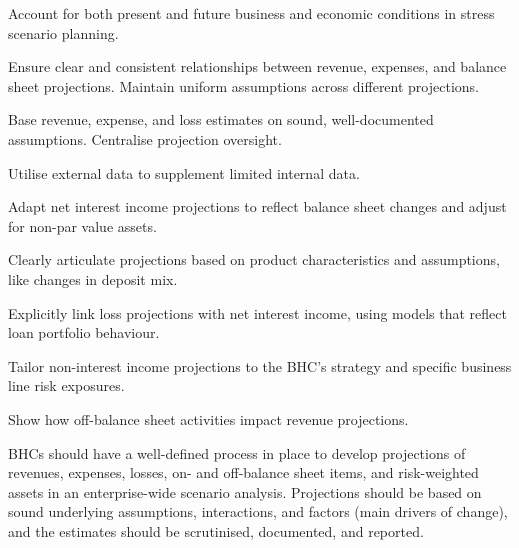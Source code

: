 \begin{lettered}
\item Account for both present and future business and economic conditions in
stress scenario planning.
\item Ensure clear and consistent relationships between revenue, expenses, and
balance sheet projections. Maintain uniform assumptions across different
projections.
\item Base revenue, expense, and loss estimates on sound, well-documented
assumptions. Centralise projection oversight.
\item Utilise external data to supplement limited internal data.
\item Adapt net interest income projections to reflect balance sheet changes and
adjust for non-par value assets.
\item Clearly articulate projections based on product characteristics and
assumptions, like changes in deposit mix.
\item Explicitly link loss projections with net interest income, using models that
reflect loan portfolio behaviour.
\item Tailor non-interest income projections to the BHC's strategy and specific
business line risk exposures.
\item Show how off-balance sheet activities impact revenue projections.
\end{lettered}


BHCs should have a well-defined process in place to develop projections of
revenues, expenses, losses, on- and off-balance sheet items, and risk-weighted
assets in an enterprise-wide scenario analysis. Projections should be based on
sound underlying assumptions, interactions, and factors (main drivers of change),
and the estimates should be scrutinised, documented, and reported.
